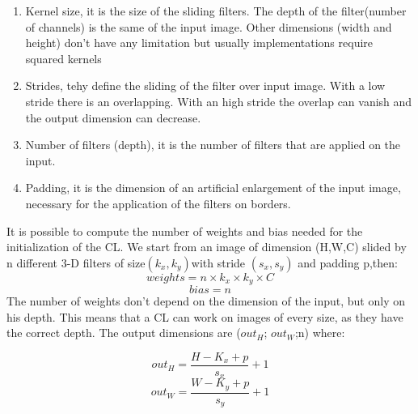 \documentclass[a4paper, 10pt]{book}
\begin{document}
\begin{enumerate}

\item	Kernel size, it is the size of the sliding filters. The depth of the filter(number of channels) is the same of the input image. Other dimensions (width and height) don’t  have  any limitation but usually implementations require squared kernels
\item	Strides, tehy define the sliding of the filter over input image. With a low stride there is an overlapping. With an high stride the overlap can vanish and the output dimension can decrease.
\item	Number of filters (depth), it is the number of filters that are applied on the input.
\item	Padding, it is the dimension of an artificial enlargement of the input image, necessary for the application of the filters on borders.
\end{enumerate}

It is possible to compute the number of weights and bias needed for the initialization of the CL.
We start from an image of dimension (H,W,C) slided by n different 3-D filters of size$(k_x,k_y) $with stride $(s_x,s_y)$ and padding p,then:
\begin{equation}
    \label{weights}
 weights = n \times k_x \times k_y \times C
\end{equation}
\begin{equation}
    \label{bias}
 bias = n
\end{equation}
The number of weights don’t depend on the dimension of the input, but only on his depth. This means that a CL can work on images of every size, as they have the correct depth.
The output dimensions are ($out_H$; $out_W$;n) where:

\begin{equation}
    \label{out_h}
out_H = \frac{H-K_x +p}{s_x} +1\end{equation}
\begin{equation}
    \label{out_W}
out_W = \frac{W-K_y +p}{s_y} +1\end{equation}
\end{document}

